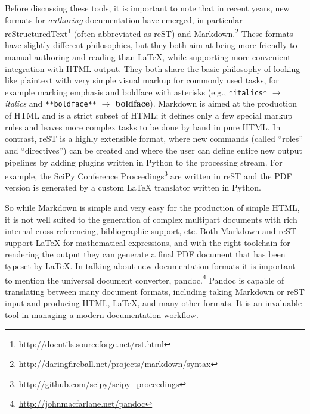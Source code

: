 \documentclass[ChapterTOCs,krantz2]{krantz} %
\begin{document}
Before discussing these tools, it is important to note that in recent years,
new formats for \emph{authoring} documentation have emerged, in particular
reStructuredText\footnote{\url{http://docutils.sourceforge.net/rst.html}}
(often abbreviated as reST) and
Markdown.\footnote{\url{http://daringfireball.net/projects/markdown/syntax}}
These formats have slightly different philosophies, but they both aim at being
more friendly to manual authoring and reading than \LaTeX{}, while supporting
more convenient integration with HTML output.  They both share the basic
philosophy of looking like plaintext with very simple visual markup for
commonly used tasks, for example marking emphasis and boldface with asterisks
(e.g., \texttt{*italics*} $\rightarrow$ \emph{italics} and
\texttt{**boldface**} $\rightarrow$ \textbf{boldface}).  Markdown is aimed at
the production of HTML and is a strict subset of HTML; it defines only a few
special markup rules and leaves more complex tasks to be done by hand in pure
HTML.  In contrast, reST is a highly extensible format, where new commands
(called ``roles'' and ``directives'') can be created and where the user can
define entire new output pipelines by adding plugins written in Python to the
processing stream. For example, the SciPy Conference
Proceedings\footnote{\url{http://github.com/scipy/scipy_proceedings}} are
written in reST and the PDF version is generated by a custom \LaTeX{}
translator written in Python.

So while Markdown is simple and very easy for the production of simple HTML, it
is not well suited to the generation of complex multipart documents with rich
internal cross-referencing, bibliographic support, etc.  Both Markdown and reST
support \LaTeX{} for mathematical expressions, and with the right toolchain for
rendering the output they can generate a final PDF document that has been
typeset by \LaTeX{}.  In talking about new documentation formats it is
important to mention the universal document converter,
pandoc.\footnote{\url{http://johnmacfarlane.net/pandoc}} Pandoc is capable of
translating between many document formats, including taking Markdown or reST
input and producing HTML, \LaTeX{}, and many other formats.  It is an
invaluable tool in managing a modern documentation workflow.
\end{document}
